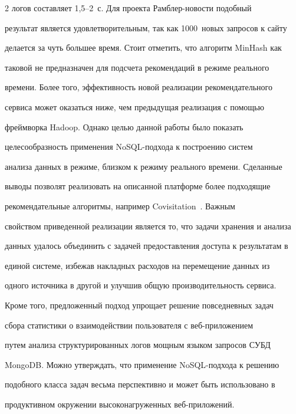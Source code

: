 \begin{multicols}{2}
логов составляет 1,5--2~с. Для проекта Рамб\-лер-но\-вос\-ти подобный 


результат является удовлетворительным, так как 1000~новых запросов к сайту 


делается за чуть большее время. Стоит отметить, что алгоритм MinHash как 


таковой не предназначен для подсчета рекомендаций в режиме реального 


времени. Более того, эффективность новой реализации рекомендательного 


сервиса может оказаться ниже, чем предыдущая реализация с по\-мощью 


фреймворка Hadoop. Однако целью данной работы было показать 


целесообразность применения NoSQL-под\-хо\-да к построению сис\-тем 


анализа данных в режиме, близком к режиму реального времени. Сделанные 


выводы позволят реализовать на описанной платформе более подходящие 


рекомендательные алгоритмы, например Covisitation~\cite{5-kli}. Важным 


свойством приведенной реализации является то, что задачи хранения и анализа 


данных удалось объединить с задачей предоставления доступа к результатам в 


единой системе, избежав накладных расходов на перемещение данных из 


одного источника в другой и улучшив общую производительность сервиса. 


Кроме того, предложенный подход упрощает решение повседневных задач 


сбора статистики о взаимодействии пользователя с веб-при\-ло\-же\-ни\-ем 


путем анализа структурированных логов мощным языком запросов СУБД 


MongoDB. Можно утверждать, что применение NoSQL-под\-хо\-да к решению 


подобного класса задач весьма перспективно и может быть использовано в 


продуктивном окружении высоконагруженных веб-при\-ло\-жений.





{\small\frenchspacing


{%




}}
\end{multicols}
